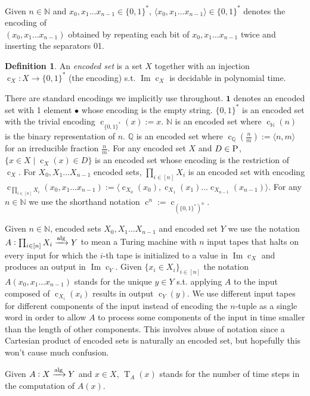 \documentclass{article}
\numberwithin{equation}{section}
\theoremstyle{definition}
\newtheorem{definition}{Definition}[section]
\theoremstyle{plain}
\newcommand{\Bool}{\{0,1\}}
\newcommand{\Words}{{\Bool^*}}
\DeclareMathOperator{\Img}{Im}
\DeclareMathOperator{\T}{T}
\DeclareMathOperator{\En}{c}
\newcommand{\Nats}{\mathbb{N}}
\newcommand{\Rats}{\mathbb{Q}}
\newcommand{\Chev}[1]{\langle #1 \rangle}
\newcommand{\Alg}{\xrightarrow{\textnormal{alg}}}
\begin{document}
Given $n \in \Nats$ and ${x_0, x_1 \ldots x_{n-1} \in \Words}$, $\Chev{x_0,x_1 \ldots x_{n-1}} \in \Words$ denotes the encoding of\\ $(x_0,x_1 \ldots x_{n-1})$ obtained by repeating each bit of $x_0, x_1 \ldots x_{n-1}$ twice and inserting the separators 01.
\begin{definition}

An \emph{encoded set} is a set $X$ together with an injection ${\En_X: X \rightarrow \Words}$ (the encoding) s.t. $\Img \En_X$ is decidable in polynomial time.

\end{definition}

There are standard encodings we implicitly use throughout. $\bm{1}$ denotes an encoded set with 1 element $\bullet$ whose encoding is the empty string. $\Words$ is an encoded set with the trivial encoding ${\En_\Words(x):=x}$. $\Nats$ is an encoded set where $\En_\Nats(n)$ is the binary representation of $n$. $\Rats$ is an encoded set where ${\En_\Rats(\frac{n}{m}):=\Chev{n,m}}$ for an irreducible fraction $\frac{n}{m}$. For any encoded set $X$ and $D \in \textsc{P}$, $\{x \in X \mid \En_X(x) \in D\}$ is an encoded set whose encoding is the restriction of $\En_X$. For $X_0,X_1 \ldots X_{n-1}$ encoded sets, $\prod_{i \in [n]} X_i$ is an encoded set with encoding $\En_{\prod_{i \in [n]} X_i}(x_0,x_1 \ldots x_{n-1}):=\Chev{\En_{X_0}(x_0),\En_{X_1}(x_1) \ldots \En_{X_{n-1}}(x_{n-1})}$. For any $n \in \Nats$ we use the shorthand notation $\En^n:=\En_{(\Words)^n}$.

Given $n \in \Nats$, encoded sets $X_0, X_1 \ldots X_{n-1}$ and encoded set $Y$ we use the notation ${A: \prod_{i \in [n]} X_i \Alg Y}$ to mean a Turing machine with $n$ input tapes that halts on every input for which the $i$-th tape is initialized to a value in $\Img \En_X$ and produces an output in $\Img \En_Y$. Given $\{x_i \in X_i\}_{i \in [n]}$ the notation $A(x_0, x_1 \ldots x_{n-1})$ stands for the unique $y \in Y$ s.t. applying $A$ to the input composed of $\En_{X_i}(x_i)$ results in output $\En_Y(y)$. We use different input tapes for different components of the input instead of encoding the $n$-tuple as a single word in order to allow $A$ to process some components of the input in time smaller than the length of other components. This involves abuse of notation since a Cartesian product of encoded sets is naturally an encoded set, but hopefully this won't cause much confusion.

Given $A: X \Alg Y$ and $x \in X$, $\T_A(x)$ stands for the number of time steps in the computation of $A(x)$.
\end{document}
